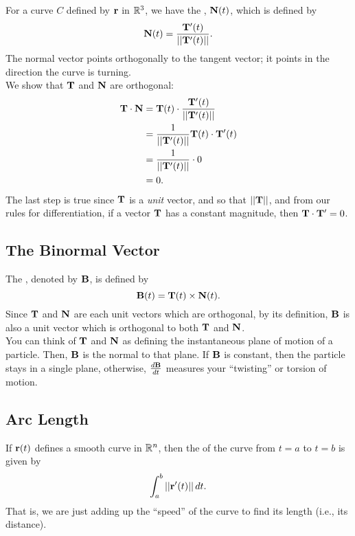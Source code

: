 For a curve \(C\) defined by \(\mathbf{r}\) in \(\mathbb{R}^{3}\), we have the , \(\mathbf{N}(t)\), which is defined by 
\[
    \mathbf{N}(t) = \frac{\mathbf{T}'(t)}{||\mathbf{T}'(t)||}.
\]
The normal vector points orthogonally to the tangent vector; it points in the direction the curve is turning. \\

We show that \(\mathbf{T}\) and \(\mathbf{N}\) are orthogonal:
\begin{align*}
    \mathbf{T} \cdot \mathbf{N} &= \mathbf{T}(t) \cdot \frac{\mathbf{T}'(t)}{||\mathbf{T}'(t)||} \\
    &= \frac{1}{||\mathbf{T}'(t)||} \mathbf{T}(t) \cdot \mathbf{T}'(t) \\
    &= \frac{1}{||\mathbf{T}'(t)||} \cdot 0 \\
    &= 0.
\end{align*}
The last step is true since \(\mathbf{T}\) is a \textit{unit} vector, and so that \(||\mathbf{T}||\), and from our rules for differentiation, if a vector \(\mathbf{T}\) has a constant magnitude, then \(\mathbf{T} \cdot \mathbf{T}' = 0\).

\subsection{The Binormal Vector}

The , denoted by \(\mathbf{B}\), is defined by
\[
    \mathbf{B}(t) = \mathbf{T}(t) \times \mathbf{N}(t).
\]
Since \(\mathbf{T}\) and \(\mathbf{N}\) are each unit vectors which are orthogonal, by its definition, \(\mathbf{B}\) is also a unit vector which is orthogonal to both \(\mathbf{T}\) and \(\mathbf{N}\). \\

You can think of \(\mathbf{T}\) and \(\mathbf{N}\) as defining the instantaneous plane of motion of a particle. Then, \(\mathbf{B}\) is the normal to that plane. If \(\mathbf{B}\) is constant, then the particle stays in a single plane, otherwise, \(\frac{d\mathbf{B}}{dt}\) measures your ``twisting'' or torsion of motion.

\subsection{Arc Length}

If \(\mathbf{r}(t)\) defines a smooth curve in \(\mathbb{R}^{n}\), then the  of the curve from \(t = a\) to \(t = b\) is given by
\[
    \int_{a}^{b} ||\mathbf{r}'(t)|| \, dt.
\]
That is, we are just adding up the ``speed'' of the curve to find its length (i.e., its distance).

